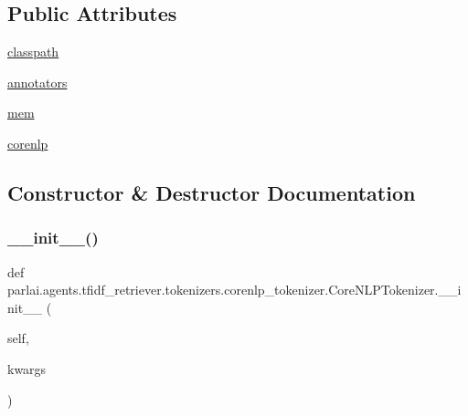\subsection*{Public Attributes}
\begin{DoxyCompactItemize}
\item 
\hyperlink{classparlai_1_1agents_1_1tfidf__retriever_1_1tokenizers_1_1corenlp__tokenizer_1_1CoreNLPTokenizer_a7364a69ba2dbb4faeeab4565d191f134}{classpath}
\item 
\hyperlink{classparlai_1_1agents_1_1tfidf__retriever_1_1tokenizers_1_1corenlp__tokenizer_1_1CoreNLPTokenizer_a3813fe96a6ae9af6f6490a6d3f4d6ea8}{annotators}
\item 
\hyperlink{classparlai_1_1agents_1_1tfidf__retriever_1_1tokenizers_1_1corenlp__tokenizer_1_1CoreNLPTokenizer_aa8bdbec985051101da11c5c7c40bfac7}{mem}
\item 
\hyperlink{classparlai_1_1agents_1_1tfidf__retriever_1_1tokenizers_1_1corenlp__tokenizer_1_1CoreNLPTokenizer_ac9ad0c796f3251450ed666160b4c35b3}{corenlp}
\end{DoxyCompactItemize}


\subsection{Constructor \& Destructor Documentation}
\mbox{\label{classparlai_1_1agents_1_1tfidf__retriever_1_1tokenizers_1_1corenlp__tokenizer_1_1CoreNLPTokenizer_a69a5d8b41630a6bb53b3680a68136e8f}} 
\subsubsection{\texorpdfstring{\+\_\+\+\_\+init\+\_\+\+\_\+()}{\_\_init\_\_()}}
{\footnotesize\ttfamily def parlai.\+agents.\+tfidf\+\_\+retriever.\+tokenizers.\+corenlp\+\_\+tokenizer.\+Core\+N\+L\+P\+Tokenizer.\+\_\+\+\_\+init\+\_\+\+\_\+ (\begin{DoxyParamCaption}\item[{}]{self,  }\item[{}]{kwargs }\end{DoxyParamCaption})}

